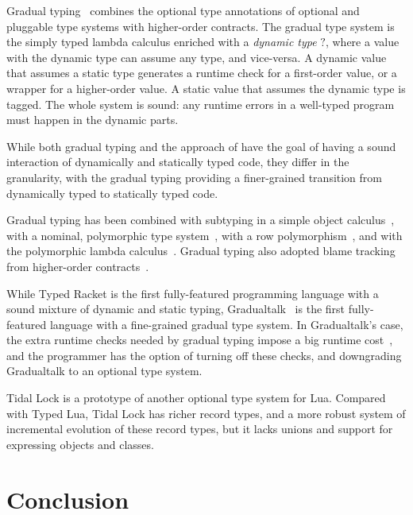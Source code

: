 \documentclass[preprint]{sig-alternate}
\begin{document}
Gradual typing~\citep{siek2006gradual} combines the
optional type annotations of optional and pluggable
type systems with higher-order contracts. The gradual
type system is the simply typed lambda calculus enriched
with a {\em dynamic type} $?$, where a value with the
dynamic type can assume any type, and vice-versa.
A dynamic value that assumes a static type generates
a runtime check for a first-order value, or a wrapper
for a higher-order value. A static value that assumes
the dynamic type is tagged. The whole system is sound:
any runtime errors in a well-typed program must happen
in the dynamic parts. 

While both gradual typing and the approach of
\citep{tobin-hochstadt2006ims} have the goal of
having a sound interaction of dynamically and statically
typed code, they differ in the granularity, with the
gradual typing providing a finer-grained transition from
dynamically typed to statically typed code.

Gradual typing has been combined with subtyping in
a simple object calculus~\citet{siek2007objects}, with
a nominal, polymorphic type system~\citet{ina:gradual},
with a row polymorphism~\citet{tobin:gradual},
and with the polymorphic lambda calculus~\citet{ahmed2011bfa}.
Gradual typing also adopted blame tracking from
higher-order
contracts~\citet{siek2010blame,ahmed2001bfa,wadler2009wpc}.

While Typed Racket is the first fully-featured programming
language with a sound mixture of dynamic and static typing,
Gradualtalk~\citep{allende2013gts} is the first 
fully-featured language with a fine-grained gradual type
system. In Gradualtalk's case, the extra runtime checks
needed by gradual typing impose a big runtime
cost~\citep{allende2013cis}, and the programmer has the
option of turning off these checks, and downgrading
Gradualtalk to an optional type system.

Tidal Lock \citep{tidallock} is a prototype of another optional
type system for Lua. Compared with Typed Lua, Tidal Lock
has richer record types, and a more robust system of
incremental evolution of these record types, but it lacks
unions and support for expressing objects and classes.

\section{Conclusion} \label{sec:con}



\end{document}
